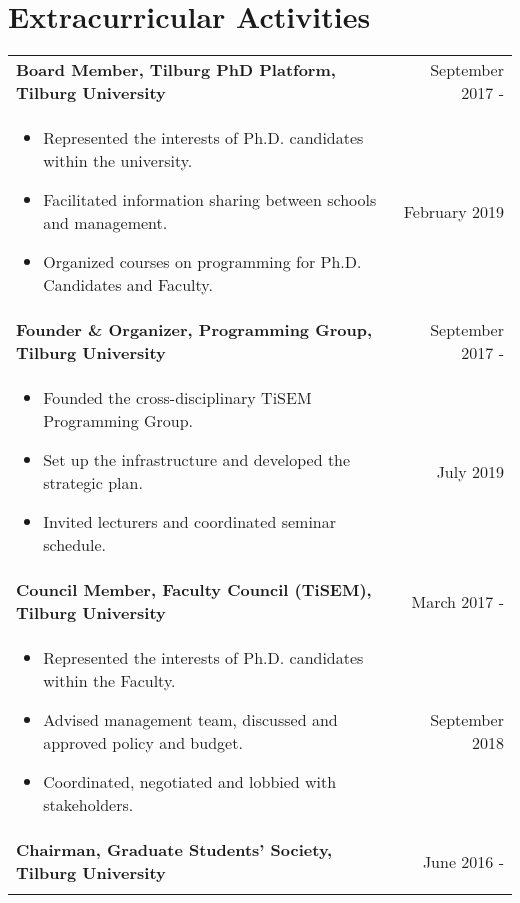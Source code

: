 \documentclass[a4paper,9pt]{article}
\begin{document}
\section{Extracurricular Activities }

\begin{tabular}{p{15cm}r}
\textbf{Board Member, Tilburg PhD Platform, Tilburg University}  &September 2017 -\\ \vspace{-0.5em}
	\begin{itemize}
		\item Represented the interests of Ph.D. candidates within the university.
		\item Facilitated information sharing between schools and management.
		\item Organized courses on programming for Ph.D. Candidates and Faculty.
	\end{itemize} & February 2019\phantom{ -}\vspace{-1.0em}\\ 
\textbf{Founder \& Organizer, Programming Group, Tilburg University}  &September 2017 -\\ \vspace{-0.5em}
	\begin{itemize}[noitemsep]
		\item Founded the cross-disciplinary TiSEM Programming Group.
		\item Set up the infrastructure and developed the strategic plan.
		\item Invited lecturers and coordinated seminar schedule.
	\end{itemize} & July 2019\phantom{ -}\vspace{-1.0em} \\ 
\textbf{Council Member, Faculty Council (TiSEM), Tilburg University}  &March 2017 -\\ \vspace{-0.5em}
	\begin{itemize}[noitemsep]
		\item Represented the interests of Ph.D. candidates within the Faculty.
		\item Advised management team, discussed and approved policy and budget.
		\item Coordinated, negotiated and lobbied with stakeholders.
	\end{itemize} & September 2018\phantom{ -}\vspace{-1.0em} \\
\textbf{Chairman, Graduate Students' Society, Tilburg University}  &June 2016 -\\ \vspace{-0.5em}

\end{tabular}
\end{document}
